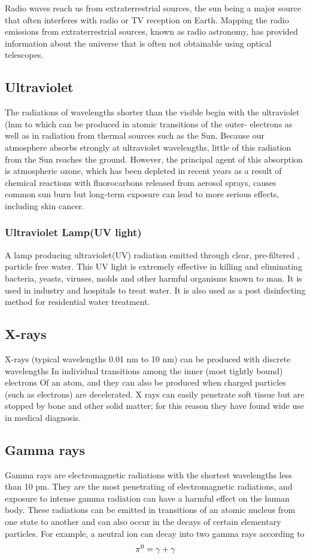 Radio waves reach us from extraterrestrial sources, the sun being a major
source that often interferes with radio or TV reception on Earth. Mapping
the radio emissions from extraterrestrial sources, known as radio
astronomy, has provided information about the universe that is often
not obtainable using optical telescopes.
\subsection{Ultraviolet}
The radiations of wavelengths shorter than the visible begin with
the ultraviolet (lnm to which can be produced in atomic transitions
of the outer- electrons as well as in radiation from thermal sources
such as the Sun. Because our atmosphere absorbs strongly at ultraviolet
wavelengths, little of this radiation from the Sun reaches the ground.
However, the principal agent of this absorption is atmospheric ozone,
which has been depleted in recent years as a result of chemical reactions
with fluorocarbons released from aerosol sprays, causes common sun burn
but long-term exposure can lead to more serious effects, including skin
cancer. 
\subsubsection{Ultraviolet Lamp(UV light)}
A lamp producing ultraviolet(UV) radiation emitted through clear,
pre-filtered , particle free water. This UV light is extremely effective
in killing and eliminating bacteria, yeasts, viruses, molds and other
harmful organisms known to man. It is used in industry and hospitals to
treat water. It is also used as a post disinfecting method for residential
water treatment. 
\subsection{X-rays}
X-rays (typical wavelengths 0.01 nm to 10 nm) can be produced with
discrete wavelengths In individual transitions among the inner
(most tightly bound) electrons Of an atom, and they can also be produced
when charged particles (such as electrons) are decelerated.
X rays can easily penetrate soft tissue but are stopped by bone and other
solid matter; for this reason they have found wide use in medical diagnosis.
\subsection{Gamma rays}
Gamma rays are electromagnetic radiations with the shortest wavelengths
less than 10 pm. They are the most penetrating of electromagnetic
radiations, and exposure to intense gamma radiation can have a harmful
effect on the human body. These radiations can be emitted in transitions
of an atomic nucleus from one state to another and can also occur in the
decays of certain elementary particles. For example, a neutral ion can
decay into two gamma rays according to
\begin{equation}\notag
    \pi^{0} = \gamma + \gamma
\end{equation}
